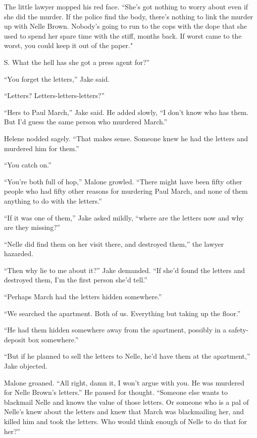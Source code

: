 \documentclass{novel}
\begin{document}
The little lawyer mopped his red face. “She’s got nothing to worry about even if she did the murder. If the police find the body, there’s nothing to link the murder up with Nelle Brown. Nobody’s going to run to the cops with the dope that she used to spend her spare time with the stiff, months back. If worst came to the worst, you could keep it out of the paper."

S. What the hell has she got a press agent for?”

“You forget the letters,” Jake said.

“Letters? Letters-letters-letters?”

“Hers to Paul March,” Jake said. He added slowly, “I don’t know who has them. But I’d guess the same person who murdered March.”

Helene nodded sagely. “That makes sense. Someone knew he had the letters and murdered him for them.”

“You catch on.”

“You’re both full of hop,” Malone growled. “There might have been fifty other people who had fifty other reasons for murdering Paul March, and none of them anything to do with the letters.”

“If it was one of them,” Jake asked mildly, “where are the letters now and why are they missing?”

“Nelle did find them on her visit there, and destroyed them,” the lawyer hazarded.

“Then why lie to me about it?” Jake demanded. “If she’d found the letters and destroyed them, I’m the first person she’d tell.”

“Perhaps March had the letters hidden somewhere.”

“We searched the apartment. Both of us. Everything but taking up the floor.”

“He had them hidden somewhere away from the apartment, possibly in a safety-deposit box somewhere.”

“But if he planned to sell the letters to Nelle, he’d have them at the apartment,” Jake objected.

Malone groaned. “All right, damn it, I won’t argue with you. He was murdered for Nelle Brown’s letters.” He paused for thought. “Someone else wants to blackmail Nelle and knows the value of those letters. Or someone who is a pal of Nelle’s knew about the letters and knew that March was blackmailing her, and killed him and took the letters. Who would think enough of Nelle to do that for her?”
\end{document}
